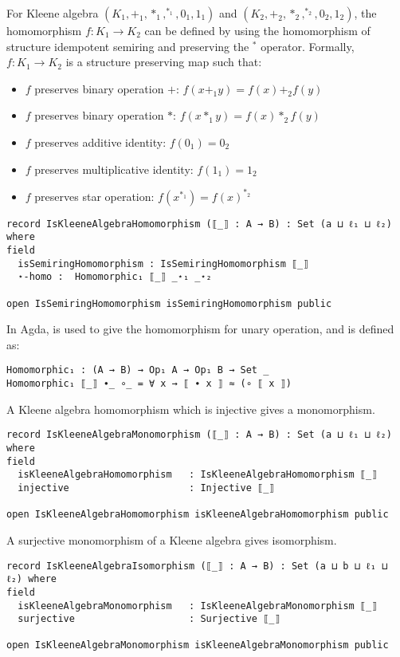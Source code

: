 For Kleene algebra $(K_1,+_1,*_1,^{*_1},0_1,1_1)$ and
$(K_2,+_2,*_2,^{*_2},0_2,1_2)$, the homomorphism $f: K_1 \rightarrow K_2$ can be
defined by using the homomorphism of structure idempotent semiring and
preserving the $^{*}$ operator. Formally, $f: K_1 \rightarrow K_2$ is a
structure preserving map such that:
\begin{itemize}
\item $f$ preserves binary operation $+$: $f(x +_1 y) = f(x) +_2 f(y)$
\item $f$ preserves binary operation $*$: $f(x *_1 y) = f(x) *_2 f(y)$
\item $f$ preserves additive identity: $f(0_1) = 0_2$
\item $f$ preserves multiplicative identity: $f(1_1) = 1_2$
\item $f$ preserves star operation: $f(x^{*_1}) = f(x)^{*_2}$
\end{itemize}
\begin{verbatim}
record IsKleeneAlgebraHomomorphism (⟦_⟧ : A → B) : Set (a ⊔ ℓ₁ ⊔ ℓ₂) where
field
  isSemiringHomomorphism : IsSemiringHomomorphism ⟦_⟧
  ⋆-homo :  Homomorphic₁ ⟦_⟧ _⋆₁ _⋆₂

open IsSemiringHomomorphism isSemiringHomomorphism public
\end{verbatim}
In Agda,  is used to give the homomorphism for unary
operation, and is defined as:
\begin{verbatim}
Homomorphic₁ : (A → B) → Op₁ A → Op₁ B → Set _
Homomorphic₁ ⟦_⟧ ∙_ ∘_ = ∀ x → ⟦ ∙ x ⟧ ≈ (∘ ⟦ x ⟧)
\end{verbatim} 
A Kleene algebra homomorphism which is injective gives a monomorphism. 
\begin{verbatim}
record IsKleeneAlgebraMonomorphism (⟦_⟧ : A → B) : Set (a ⊔ ℓ₁ ⊔ ℓ₂) where
field
  isKleeneAlgebraHomomorphism   : IsKleeneAlgebraHomomorphism ⟦_⟧
  injective                     : Injective ⟦_⟧

open IsKleeneAlgebraHomomorphism isKleeneAlgebraHomomorphism public
\end{verbatim}

A surjective monomorphism of a Kleene algebra gives isomorphism.
\begin{verbatim}
record IsKleeneAlgebraIsomorphism (⟦_⟧ : A → B) : Set (a ⊔ b ⊔ ℓ₁ ⊔ ℓ₂) where
field
  isKleeneAlgebraMonomorphism   : IsKleeneAlgebraMonomorphism ⟦_⟧
  surjective                    : Surjective ⟦_⟧

open IsKleeneAlgebraMonomorphism isKleeneAlgebraMonomorphism public
\end{verbatim}

